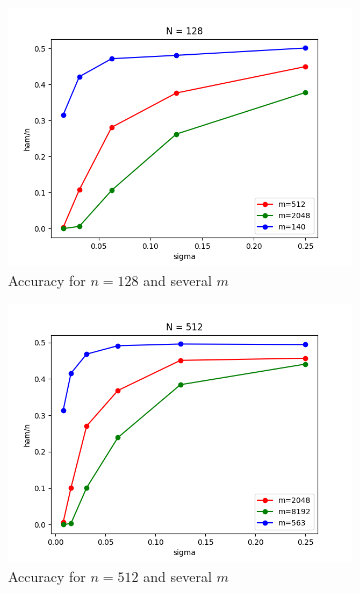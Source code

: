 \begin{figure}
    \centering
    \begin{subfigure}[b]{0.49\textwidth}
        \includegraphics[width=\textwidth]{random/Random-N128.png}
        \caption{Accuracy for $n=128$ and several $m$}
    \end{subfigure}
    \begin{subfigure}[b]{0.49\textwidth}
        \includegraphics[width=\textwidth]{random/Random-N512.png}
        \caption{Accuracy for $n=512$ and several $m$}
    \end{subfigure}
    \begin{subfigure}[b]{0.49\textwidth}

\end{subfigure}
\end{figure}
